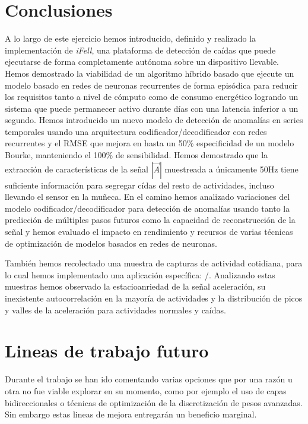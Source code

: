 
\section{Conclusiones}

A lo largo de este ejercicio hemos introducido, definido y realizado la implementación de \textit{iFell}, una plataforma de detección de caídas que puede ejecutarse de forma completamente autónoma
sobre un dispositivo llevable. Hemos demostrado la viabilidad de un algoritmo híbrido basado que ejecute un modelo basado en redes de neuronas recurrentes de forma episódica para reducir los requisitos tanto a nivel de cómputo como de consumo energético logrando un sistema que puede permanecer activo durante días con una latencia inferior a un segundo. Hemos introducido un nuevo modelo de detección de anomalías en series temporales usando una arquitectura codificador/decodificador con redes recurrentes y el RMSE que mejora en hasta un 50\% especificidad de un modelo Bourke, manteniendo el 100\% de sensibilidad. Hemos demostrado que la extracción de características de la señal $|\vec{A}|$ muestreada a únicamente 50Hz tiene suficiente información para segregar cídas del resto de actividades, incluso llevando el sensor en la muñeca. En el camino hemos analizado variaciones del modelo codificador/decodificador para detección de anomalías usando tanto la predicción de múltiples pasos futuros como la capacidad de reconstrucción de la señal y hemos evaluado el impacto en rendimiento y recursos de varias técnicas de optimización de modelos basados en redes de neuronas.

También hemos recolectado una muestra de capturas de actividad cotidiana, para lo cual hemos implementado una aplicación específica: \accelcapture/. Analizando estas muestras hemos observado la estacioanriedad de la señal aceleración, su inexistente autocorrelación en la mayoría de actividades y la distribución de picos y valles de la aceleración para actividades normales y caídas.




\section{Lineas de trabajo futuro}

Durante el trabajo se han ido comentando varias opciones que por una razón u otra no fue viable explorar en su momento, como por ejemplo el uso de capas bidireccionales o técnicas de optimización de la discretización de pesos avanzadas. Sin embargo estas lineas de mejora entregarán un beneficio marginal.

